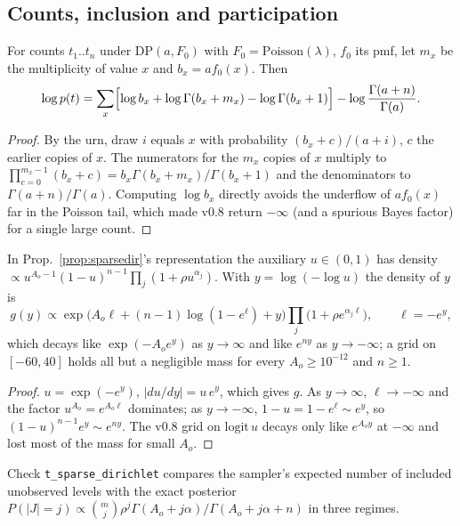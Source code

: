 \subsection{Counts, inclusion and participation}
\begin{proposition}\label{prop:dpclosed}
For counts $t_1..t_n$ under $\mathrm{DP}(a,F_0)$ with $F_0=\mathrm{Poisson}(\lambda)$, $f_0$ its pmf, let $m_x$ be the multiplicity of value $x$ and $b_x=a f_0(x)$. Then
\[\log p(t)=\sum_x\Bigl[\log b_x+\log\Gamma(b_x+m_x)-\log\Gamma(b_x+1)\Bigr]-\log\frac{\Gamma(a+n)}{\Gamma(a)}.\]
\end{proposition}
\begin{proof}
By the urn, draw $i$ equals $x$ with probability $(b_x+c)/(a+i)$, $c$ the earlier copies of $x$. The numerators for the $m_x$ copies of $x$ multiply to $\prod_{c=0}^{m_x-1}(b_x+c)=b_x\Gamma(b_x+m_x)/\Gamma(b_x+1)$ and the denominators to $\Gamma(a+n)/\Gamma(a)$. Computing $\log b_x$ directly avoids the underflow of $a f_0(x)$ far in the Poisson tail, which made v0.8 return $-\infty$ (and a spurious Bayes factor) for a single large count.
\end{proof}

\begin{proposition}\label{prop:sdgrid}
In Prop.~\ref{prop:sparsedir}'s representation the auxiliary $u\in(0,1)$ has density $\propto u^{A_o-1}(1-u)^{n-1}\prod_j(1+\rho u^{\alpha_j})$. With $y=\log(-\log u)$ the density of $y$ is
\[g(y)\propto\exp\bigl(A_o\ell+(n-1)\log(1-e^{\ell})+y\bigr)\prod_j\bigl(1+\rho e^{\alpha_j\ell}\bigr),\qquad\ell=-e^{y},\]
which decays like $\exp(-A_oe^{y})$ as $y\to\infty$ and like $e^{ny}$ as $y\to-\infty$; a grid on $[-60,40]$ holds all but a negligible mass for every $A_o\ge10^{-12}$ and $n\ge1$.
\end{proposition}
\begin{proof}
$u=\exp(-e^y)$, $|du/dy|=u\,e^y$, which gives $g$. As $y\to\infty$, $\ell\to-\infty$ and the factor $u^{A_o}=e^{A_o\ell}$ dominates; as $y\to-\infty$, $1-u=1-e^{\ell}\sim e^{y}$, so $(1-u)^{n-1}e^{y}\sim e^{ny}$. The v0.8 grid on $\mathrm{logit}\,u$ decays only like $e^{A_oy}$ at $-\infty$ and lost most of the mass for small $A_o$.
\end{proof}
\noindent Check \texttt{t\_sparse\_dirichlet} compares the sampler's expected number of included unobserved levels with the exact posterior $P(|J|=j)\propto\binom mj\rho^j\Gamma(A_o+j\alpha)/\Gamma(A_o+j\alpha+n)$ in three regimes.

